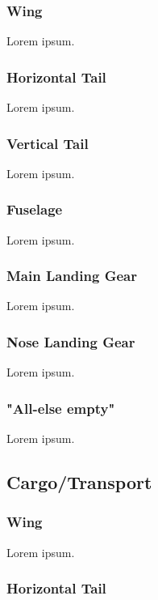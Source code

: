 \subsubsection{Wing}

Lorem ipsum.

\subsubsection{Horizontal Tail}

Lorem ipsum.

\subsubsection{Vertical Tail}

Lorem ipsum.

\subsubsection{Fuselage}

Lorem ipsum.

\subsubsection{Main Landing Gear}

Lorem ipsum.

\subsubsection{Nose Landing Gear}

Lorem ipsum.

\subsubsection{"All-else empty"}

Lorem ipsum.

\subsection{Cargo/Transport}

\subsubsection{Wing}

Lorem ipsum.

\subsubsection{Horizontal Tail}

